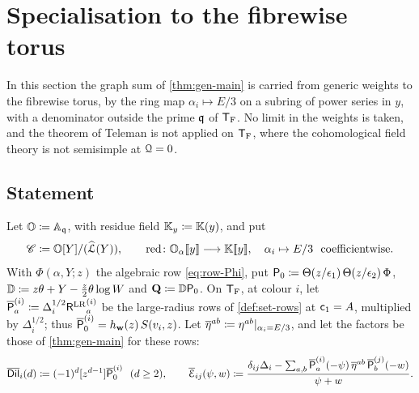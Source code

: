 \section{Specialisation to the fibrewise torus}
\label{sec:spe}

In this section the graph sum of \cref{thm:gen-main} is carried from generic weights to the fibrewise torus, by the ring map $\alpha_i\mapsto E/3$ on a subring of power series in $y$, with a denominator outside the prime $\mathfrak{q}$ of $\mathsf{T}_{\mathrm{F}}$. No limit in the weights is taken, and the theorem of Teleman is not applied on $\mathsf{T}_{\mathrm{F}}$, where the cohomological field theory is not semisimple at $\mathcal{Q}=0$.

\subsection{Statement}
\label{sec:spe-statement}

Let $\mathbb{O}\coloneqq\mathbb{A}_{\mathfrak{q}}$, with residue field $\mathbb{K}_{y}\coloneqq\mathbb{K}(y)$, and put
\[
\mathscr{C}\coloneqq\mathbb{O}[Y]/(\widehat{\mathcal{L}}(Y)),\qquad \mathrm{red}\colon\mathbb{O}_{\alpha}[\![ y ]\!]\longrightarrow\mathbb{K}[\![ y ]\!],\quad \alpha_i\mapsto E/3\ \text{ coefficientwise}.
\]
With $\Phi(\alpha,Y;z)$ the algebraic row \eqref{eq:row-Phi}, put $\mathsf{P}_0\coloneqq\Theta(z/\epsilon_1)\,\Theta(z/\epsilon_2)\,\Phi$, $\mathbb{D}\coloneqq z\theta+Y-\frac{z}{2}\theta\log W$ and $\mathbf{Q}\coloneqq\mathbb{D}\mathsf{P}_0$. On $\mathsf{T}_{\mathrm{F}}$, at colour $i$, let $\overline{\mathsf{P}}_a^{(i)}\coloneqq\Delta_i^{1/2}{\mathsf{R}^{\mathrm{LR}}}_a^{(i)}$ be the large-radius rows of \cref{def:set-rows} at $\mathsf{c}_{1}=A$, multiplied by $\Delta_i^{1/2}$; thus $\overline{\mathsf{P}}_0^{(i)}=h_{\mathbf{w}}(z)\,S(v_i,z)$. Let $\overline{\eta}^{ab}\coloneqq\eta^{ab}|_{\alpha_i=E/3}$, and let the factors be those of \cref{thm:gen-main} for these rows:
\[
\Dilb_i(d)\coloneqq(-1)^d[z^{d-1}]\Pb_0^{(i)}\ \ (d\geq2),\qquad
\Edgeb_{ij}(\psi,w)\coloneqq\frac{\delta_{ij}\Delta_i-\sum_{a,b}\Pb_a^{(i)}(-\psi)\,\speEtab^{ab}\,\Pb_b^{(j)}(-w)}{\psi+w}.
\]

